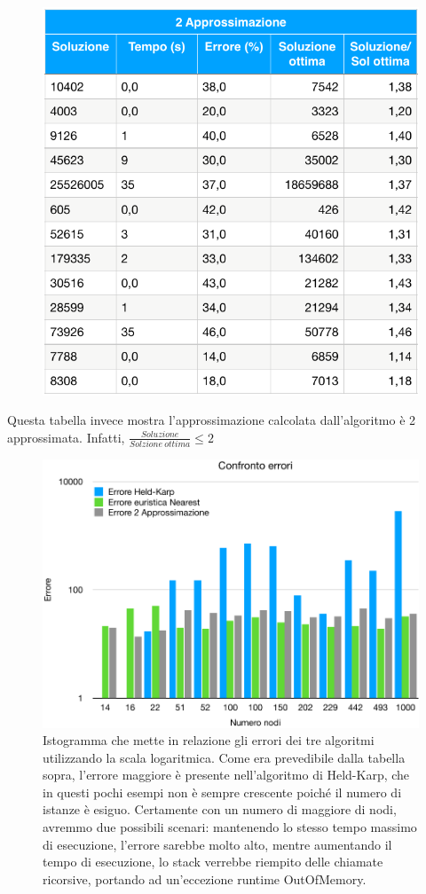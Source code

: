 \documentclass[a4paper]{article}
\begin{document}
\begin{figure}[H]
	\centering
	\includegraphics[width=0.5\linewidth]{2approx}
	\label{fig:2approx}
\end{figure}
Questa tabella invece mostra l'approssimazione calcolata dall'algoritmo è 2 approssimata. Infatti,
$\frac{Soluzione}{Solzione\ ottima} \leq 2$
\begin{figure}[H]
	\begin{center}
	\includegraphics[width=17cm]{errore}
	\caption{Istogramma che mette in relazione gli errori dei tre algoritmi utilizzando la scala logaritmica. Come era prevedibile dalla tabella sopra, l'errore maggiore è presente nell'algoritmo di Held-Karp, che in questi pochi esempi non è sempre crescente poiché il numero di istanze è esiguo. Certamente con un numero di maggiore di nodi, avremmo due possibili scenari: mantenendo lo stesso tempo massimo di esecuzione, l'errore sarebbe molto alto, mentre aumentando il tempo di esecuzione, lo stack verrebbe riempito delle chiamate ricorsive, portando ad un'eccezione runtime OutOfMemory.}	\label{fig:errore}
\end{center}
\end{figure}
\end{document}

